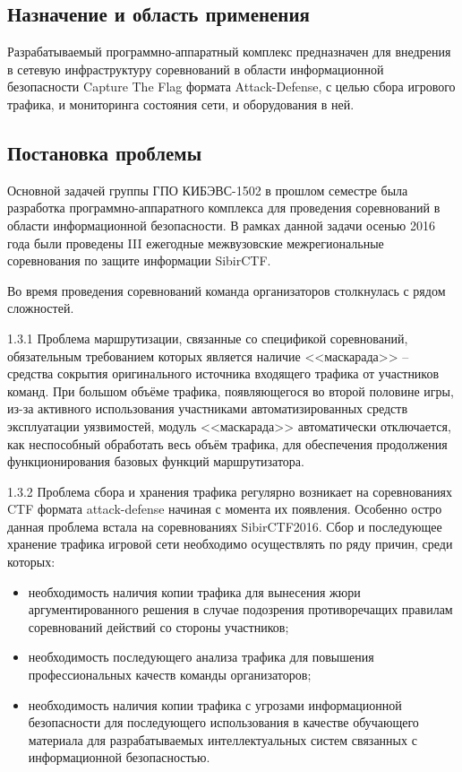 \subsection{Назначение и область применения}
Разрабатываемый программно-аппаратный комплекс предназначен для внедрения в сетевую инфраструктуру соревнований в области информационной безопасности Capture The Flag формата Attack-Defense, с целью сбора игрового трафика, и мониторинга состояния сети, и оборудования в ней.

\clearpage

\subsection{Постановка проблемы}
Основной задачей группы ГПО КИБЭВС-1502 в прошлом семестре была разработка программно-аппаратного комплекса для проведения соревнований в области информационной безопасности. В рамках данной задачи осенью 2016 года были проведены III ежегодные межвузовские межрегиональные соревнования по защите информации SibirCTF.\par 

Во время проведения соревнований команда организаторов столкнулась с рядом сложностей.\par

1.3.1  Проблема маршрутизации, связанные со спецификой соревнований, обязательным требованием которых является наличие <<маскарада>> -- средства сокрытия оригинального источника входящего трафика от участников команд. При большом объёме трафика, появляющегося во второй половине игры, из-за активного использования участниками автоматизированных средств эксплуатации уязвимостей, модуль <<маскарада>> автоматически отключается, как неспособный обработать весь объём трафика, для обеспечения продолжения функционирования базовых функций маршрутизатора.\par

1.3.2  Проблема сбора и хранения трафика регулярно возникает на соревнованиях CTF формата attack-defense начиная с момента их появления. Особенно остро данная проблема встала на соревнованиях SibirCTF2016. Сбор и последующее хранение трафика игровой сети необходимо осуществлять по ряду причин, среди которых:

\begin{itemize}
\item необходимость наличия копии трафика для вынесения жюри аргументированного решения в случае подозрения противоречащих правилам соревнований действий со стороны участников;
\item необходимость последующего анализа трафика для повышения профессиональных качеств команды организаторов;
\item необходимость наличия копии трафика с угрозами информационной безопасности для последующего использования в качестве обучающего материала для разрабатываемых интеллектуальных систем связанных с информационной безопасностью.
\end{itemize}\par 

